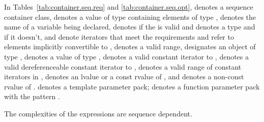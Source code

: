 \pnum
In Tables~\ref{tab:container.seq.req}
and \ref{tab:container.seq.opt},
 denotes a sequence container class,
 denotes a value of type  containing elements of type ,
 denotes the name of a variable being declared,
 denotes  if
the   is valid and denotes a
type and
 if it doesn't,
 and 
denote iterators that meet the  requirements
and refer to elements implicitly convertible to ,
denotes a valid range,
 designates an object of type ,
denotes a value of type ,
 denotes a valid constant iterator to
, 
denotes a valid dereferenceable constant iterator to
, 
denotes a valid range of constant iterators in
, 
denotes an lvalue or a const rvalue of
, and  denotes
a non-const rvalue of .
 denotes a template parameter pack;
 denotes a function parameter pack with the pattern .

\pnum
The complexities of the expressions are sequence dependent.

